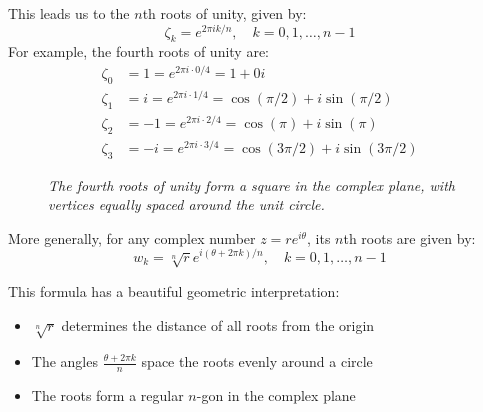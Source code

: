 \noindent This leads us to the $n$th roots of unity, given by:
\[
\zeta_k = e^{2\pi i k/n}, \quad k = 0,1,\ldots,n-1
\]
\noindent For example, the fourth roots of unity are:
\begin{align*}
\zeta_0 &= 1 = e^{2\pi i \cdot 0/4} = 1 + 0i \\
\zeta_1 &= i = e^{2\pi i \cdot 1/4} = \cos(\pi/2) + i\sin(\pi/2) \\
\zeta_2 &= -1 = e^{2\pi i \cdot 2/4} = \cos(\pi) + i\sin(\pi) \\
\zeta_3 &= -i = e^{2\pi i \cdot 3/4} = \cos(3\pi/2) + i\sin(3\pi/2)
\end{align*}

\begin{figure}[H]
\centering
{}
\caption{\textit{The fourth roots of unity form a square in the complex plane, with vertices equally spaced around the unit circle.}}
\label{fig:fourth-roots}
\end{figure}



\noindent More generally, for any complex number $z = re^{i\theta}$, its $n$th roots are given by:
\[
w_k = \sqrt[n]{r}e^{i(\theta + 2\pi k)/n}, \quad k = 0,1,\ldots,n-1
\]

\noindent This formula has a beautiful geometric interpretation:
\begin{itemize}
   \item $\sqrt[n]{r}$ determines the distance of all roots from the origin
   \item The angles $\frac{\theta + 2\pi k}{n}$ space the roots evenly around a circle
   \item The roots form a regular $n$-gon in the complex plane
\end{itemize}

